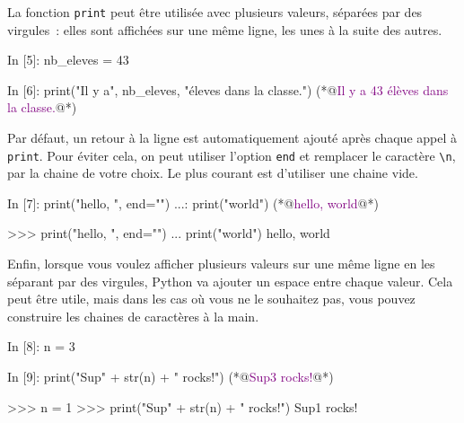 \documentclass{magnoliaold}
\begin{document}
La fonction \verb_print_ peut être utilisée avec plusieurs valeurs, séparées par des 
virgules~: elles sont affichées sur une même ligne, les unes à la suite des autres.

\begin{pythoncode}
In [5]: nb_eleves = 43

In [6]: print("Il y a", nb_eleves, "éleves dans la classe.")
(*@\textcolor{purple}{Il y a 43 élèves dans la classe.}@*)
\end{pythoncode}

\noindent
Par défaut, un retour à la ligne est automatiquement ajouté après chaque appel à
\verb_print_. Pour éviter cela, on peut utiliser l'option \verb_end_ et remplacer le
caractère \og\verb_\n_\fg, par la chaine de votre choix. Le plus courant est d'utiliser
une chaine vide.

\begin{francois}
\begin{pythoncode}
In [7]: print("hello, ", end="")
   ...: print("world")
(*@\textcolor{purple}{hello, world}@*)
\end{pythoncode}
\end{francois}
\begin{victor}
\begin{pythoncode}
>>> print("hello, ", end="")
... print("world")
hello, world
\end{pythoncode}
\end{victor}

\noindent
Enfin, lorsque vous voulez afficher plusieurs valeurs sur une même ligne en les séparant par
des virgules, Python va ajouter un espace entre chaque valeur. Cela peut être utile, mais 
dans les cas où vous ne le souhaitez pas, vous pouvez construire les chaines de 
caractères à la main.

\begin{francois}
\begin{pythoncode}
In [8]: n = 3

In [9]: print("Sup" + str(n) + " rocks!")
(*@\textcolor{purple}{Sup3 rocks!}@*)
\end{pythoncode}
\end{francois}
\begin{victor}
\begin{pythoncode}
>>> n = 1
>>> print("Sup" + str(n) + " rocks!")
Sup1 rocks!
\end{pythoncode}
\end{victor}
\end{document}
